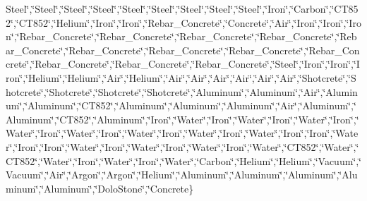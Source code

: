 {}Steel\char`\"{},\char`\"{}Steel\char`\"{},\char`\"{}Steel\char`\"{},\char`\"{}Steel\char`\"{},\char`\"{}Steel\char`\"{},\char`\"{}Steel\char`\"{},\char`\"{}Steel\char`\"{},\char`\"{}Steel\char`\"{},\char`\"{}Steel\char`\"{},\char`\"{}Iron\char`\"{},\char`\"{}Carbon\char`\"{},\char`\"{}C\-T852\char`\"{},\char`\"{}C\-T852\char`\"{},\char`\"{}Helium\char`\"{},\char`\"{}Iron\char`\"{},\char`\"{}Iron\char`\"{},\char`\"{}Rebar\-\_\-\-Concrete\char`\"{},\char`\"{}Concrete\char`\"{},\char`\"{}Air\char`\"{},\char`\"{}Iron\char`\"{},\char`\"{}Iron\char`\"{},\char`\"{}Iron\char`\"{},\char`\"{}Rebar\-\_\-\-Concrete\char`\"{},\char`\"{}Rebar\-\_\-\-Concrete\char`\"{},\char`\"{}Rebar\-\_\-\-Concrete\char`\"{},\char`\"{}Rebar\-\_\-\-Concrete\char`\"{},\char`\"{}Rebar\-\_\-\-Concrete\char`\"{},\char`\"{}Rebar\-\_\-\-Concrete\char`\"{},\char`\"{}Rebar\-\_\-\-Concrete\char`\"{},\char`\"{}Rebar\-\_\-\-Concrete\char`\"{},\char`\"{}Rebar\-\_\-\-Concrete\char`\"{},\char`\"{}Rebar\-\_\-\-Concrete\char`\"{},\char`\"{}Rebar\-\_\-\-Concrete\char`\"{},\char`\"{}Rebar\-\_\-\-Concrete\char`\"{},\char`\"{}Steel\char`\"{},\char`\"{}Iron\char`\"{},\char`\"{}Iron\char`\"{},\char`\"{}Iron\char`\"{},\char`\"{}Helium\char`\"{},\char`\"{}Helium\char`\"{},\char`\"{}Air\char`\"{},\char`\"{}Helium\char`\"{},\char`\"{}Air\char`\"{},\char`\"{}Air\char`\"{},\char`\"{}Air\char`\"{},\char`\"{}Air\char`\"{},\char`\"{}Air\char`\"{},\char`\"{}Air\char`\"{},\char`\"{}Shotcrete\char`\"{},\char`\"{}Shotcrete\char`\"{},\char`\"{}Shotcrete\char`\"{},\char`\"{}Shotcrete\char`\"{},\char`\"{}Shotcrete\char`\"{},\char`\"{}Aluminum\char`\"{},\char`\"{}Aluminum\char`\"{},\char`\"{}Air\char`\"{},\char`\"{}Aluminum\char`\"{},\char`\"{}Aluminum\char`\"{},\char`\"{}C\-T852\char`\"{},\char`\"{}Aluminum\char`\"{},\char`\"{}Aluminum\char`\"{},\char`\"{}Aluminum\char`\"{},\char`\"{}Air\char`\"{},\char`\"{}Aluminum\char`\"{},\char`\"{}Aluminum\char`\"{},\char`\"{}C\-T852\char`\"{},\char`\"{}Aluminum\char`\"{},\char`\"{}Iron\char`\"{},\char`\"{}Water\char`\"{},\char`\"{}Iron\char`\"{},\char`\"{}Water\char`\"{},\char`\"{}Iron\char`\"{},\char`\"{}Water\char`\"{},\char`\"{}Iron\char`\"{},\char`\"{}Water\char`\"{},\char`\"{}Iron\char`\"{},\char`\"{}Water\char`\"{},\char`\"{}Iron\char`\"{},\char`\"{}Water\char`\"{},\char`\"{}Iron\char`\"{},\char`\"{}Water\char`\"{},\char`\"{}Iron\char`\"{},\char`\"{}Water\char`\"{},\char`\"{}Iron\char`\"{},\char`\"{}Iron\char`\"{},\char`\"{}Water\char`\"{},\char`\"{}Iron\char`\"{},\char`\"{}Iron\char`\"{},\char`\"{}Water\char`\"{},\char`\"{}Iron\char`\"{},\char`\"{}Water\char`\"{},\char`\"{}Iron\char`\"{},\char`\"{}Water\char`\"{},\char`\"{}Iron\char`\"{},\char`\"{}Water\char`\"{},\char`\"{}C\-T852\char`\"{},\char`\"{}Water\char`\"{},\char`\"{}C\-T852\char`\"{},\char`\"{}Water\char`\"{},\char`\"{}Iron\char`\"{},\char`\"{}Water\char`\"{},\char`\"{}Iron\char`\"{},\char`\"{}Water\char`\"{},\char`\"{}Carbon\char`\"{},\char`\"{}Helium\char`\"{},\char`\"{}Helium\char`\"{},\char`\"{}Vacuum\char`\"{},\char`\"{}Vacuum\char`\"{},\char`\"{}Air\char`\"{},\char`\"{}Argon\char`\"{},\char`\"{}Argon\char`\"{},\char`\"{}Helium\char`\"{},\char`\"{}Aluminum\char`\"{},\char`\"{}Aluminum\char`\"{},\char`\"{}Aluminum\char`\"{},\char`\"{}Aluminum\char`\"{},\char`\"{}Aluminum\char`\"{},\char`\"{}Dolo\-Stone\char`\"{},\char`\"{}Concrete\}
